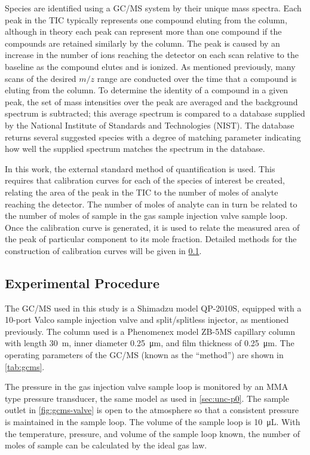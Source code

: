 \documentclass[../main.tex]{subfiles}
\begin{document}
Species are identified using a GC/MS system by their unique mass spectra.
Each peak in the TIC typically represents one compound eluting from the
column, although in theory each peak can represent more than one compound
if the compounds are retained similarly by the column. The peak is caused
by an increase in the number of ions reaching the detector on each scan
relative to the baseline as the compound elutes and is ionized. As
mentioned previously, many scans of the desired $m/z$ range are
conducted over the time that a compound is eluting from the column.
To determine the identity of a compound in a given peak, the set of
mass intensities over the peak are averaged and the background
spectrum is subtracted; this average spectrum is compared to a
database supplied by the National Institute of Standards and
Technologies (NIST). The database returns several suggested species
with a degree of matching parameter indicating how well the supplied
spectrum matches the spectrum in the database.

In this work, the external standard method of quantification is used.
This requires that calibration curves for each of the species of
interest be created, relating the area of the peak in the TIC to
the number of moles of analyte reaching the detector. The number of
moles of analyte can in turn be related to the number of moles of
sample in the gas sample injection valve sample loop. Once the
calibration curve is generated, it is used to relate the measured
area of the peak of particular component to its mole fraction. Detailed
methods for the construction of calibration curves will be given in
\cref{sec:gcms-procedure}.

\subsection{Experimental Procedure}
\label{sec:gcms-procedure}

The GC/MS used in this study is a
Shimadzu model QP-2010S, equipped with a 10-port Valco sample injection
valve and split/splitless injector, as mentioned previously. The column
used is a Phenomenex model ZB-5MS capillary column
with length \SI{30}{\meter}, inner diameter \SI{0.25}{\micro\meter}, and film
thickness of \SI{0.25}{\micro\meter}. The operating parameters of the GC/MS
(known as the ``method'') are shown in \cref{tab:gcms}.

The pressure in the gas injection valve sample loop is monitored by an
MMA type pressure transducer, the same model as used in \cref{sec:unc-p0}. The
sample outlet in \cref{fig:gcms-valve} is open to the atmosphere
so that a consistent pressure is maintained in the sample loop.
The volume of the sample loop is \SI{10}{\micro\liter}. With
the temperature, pressure, and volume of the sample loop known,
the number of moles of sample can be calculated by the ideal
gas law.
\end{document}
